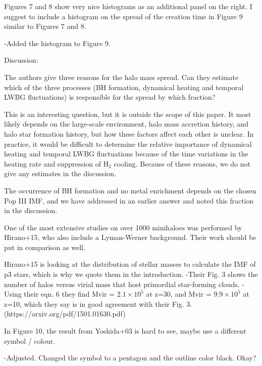 \documentclass[11pt]{article}
\newenvironment{referee}[1][]{%
    \ignorespaces%
    \begin{mdframed}[style=myquotestyle,#1]%
}{%
    \end{mdframed}%
    \ignorespacesafterend%
}%
\begin{document}
\begin{referee}
Figures 7 and 8 show very nice histograms as an additional panel on the right.  I suggest to include a histogram on the spread of the creation time in Figure 9 similar to Figures 7 and 8.
\end{referee}
-Added the histogram to Figure 9. 

\begin{referee}
Discussion:

The authors give three reasons for the halo mass spread. Can they estimate which of the three processes (BH formation, dynamical heating and temporal LWBG fluctuations) is responsible for the spread by which fraction?
\end{referee}

This is an interesting question, but it is outside the scope of this paper.  It most likely depends on the large-scale environment, halo mass accretion history, and halo star formation history, but how these factors affect each other is unclear.  In practice, it would be difficult to determine the relative importance of dynamical heating and temporal LWBG fluctuations because of the time variations in the heating rate and suppression of H$_2$ cooling.  Because of these reasons, we do not give any estimates in the discussion.

The occurrence of BH formation and no metal enrichment depends on the chosen Pop III IMF, and we have addressed in an earlier answer and noted this fraction in the discussion.

\begin{referee}
One of the most extensive studies on over 1000 minihaloes was performed by Hirano+15, who also include a Lyman-Werner background. Their work should be put in comparison as well.
\end{referee}
Hirano+15 is looking at the distribution of stellar masses to calculate the IMF of p3 stars, which is why we quote them in the introduction. 
-Their Fig. 3 shows the number of halos versus virial mass that host primordial star-forming clouds. 
-Using their eqn. 6 they find Mvir = $2.1 \times 10^5$ at z=30, and Mvir = $9.9 \times 10^5$ at z=10, which they say is in good agreement with their Fig. 3. 
(https://arxiv.org/pdf/1501.01630.pdf)

\begin{referee}
In Figure 10, the result from Yoshida+03 is hard to see, maybe use a different symbol / colour.
\end{referee}
-Adjusted. Changed the symbol to a pentagon and the outline color black. Okay?
\end{document}
